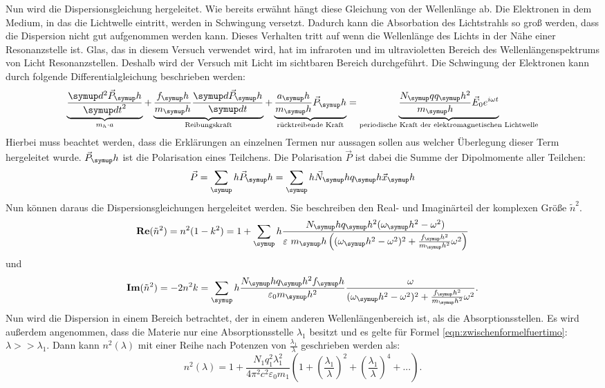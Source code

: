 Nun wird die Dispersionsgleichung hergeleitet. Wie bereits erwähnt hängt diese Gleichung
von der Wellenlänge ab. Die Elektronen in dem Medium, in das die Lichtwelle eintritt,
werden in Schwingung versetzt. Dadurch kann die Absorbation des Lichtstrahls so
groß werden, dass die Dispersion nicht gut aufgenommen werden kann. Dieses Verhalten tritt
auf wenn die Wellenlänge des Lichts in der Nähe einer Resonanzstelle ist.
Glas, das in diesem Versuch verwendet wird, hat im infraroten und im ultravioletten Bereich des
Wellenlängenspektrums von Licht Resonanzstellen. Deshalb wird der Versuch mit Licht im sichtbaren
Bereich durchgeführt.
Die Schwingung der Elektronen kann durch folgende Differentialgleichung beschrieben werden:
\begin{equation}
  \underbrace{\frac{\g{d}^2 \vec{P}_\g{h}}{\g{d t}^2}}_{m_h \cdot a}
   + \underbrace{\frac{f_\g{h}}{m_\g{h}} \frac{\g{d}\vec{P}_\g{h}}{\g{d t}}}_{\text{Reibungskraft}}
   + \underbrace{\frac{a_\g{h}}{m_\g{h}}\vec{P}_\g{h}}_{\text{rücktreibende Kraft}}
   = \underbrace{\frac{N_\g{q} q_\g{h}^2}{m_\g{h}} \vec{E}_0 e^{i \omega t}}_{\text{periodische Kraft der elektromagnetischen Lichtwelle}}
   \label{eqn:DGL}
\end{equation}
Hierbei muss beachtet werden, dass die Erklärungen an einzelnen Termen nur aussagen sollen aus welcher Überlegung
dieser Term hergeleitet wurde. $\vec{P}_\g{h}$ ist die Polarisation eines Teilchens.
Die Polarisation $\vec{P}$ ist dabei die Summe der Dipolmomente aller Teilchen:
\begin{equation*}
  \vec{P} = \sum_\g{h} \vec{P}_\g{h} = \sum_\g{h} \vec{N}_\g{h} q_\g{h} \vec{x}_\g{h}
\end{equation*}
Nun können daraus die Dispersionsgleichungen hergeleitet werden. Sie beschreiben
den Real- und Imaginärteil der komplexen Größe $\tilde{n}^2$.
\begin{equation}
  \textbf{Re}(\tilde{n}^2) = n^2(1- k^2)
  = 1 + \sum_\g{h} \frac{N_\g{h} q_\g{h}^2 (\omega_\g{h}^2-\omega^2)}{\varepsilon~m_\g{h} \left( (\omega_\g{h}^2 - \omega^2)^2 + \frac{f_\g{h}^2}{m_\g{h}^2}\omega^2 \right)}
\end{equation}
und
\begin{equation}
   \textbf{Im}(\tilde{n}^2) = -2 n^2 k
   = \sum_\g{h} \frac{N_\g{h} q_\g{h}^2 f_\g{h}}{\varepsilon_0 m_\g{h}^2} \frac{\omega}{(\omega_\g{h}^2-\omega^2)^2 + \frac{f_\g{h}^2}{m_\g{h}^2} \omega^2 }.
\end{equation}
Nun wird die Dispersion in einem Bereich betrachtet, der in einem anderen Wellenlängenbereich ist, als die Absorptionsstellen. Es wird
außerdem angenommen, dass die Materie nur eine Absorptionsstelle $\lambda_1$ besitzt und
es gelte für Formel \eqref{eqn:zwischenformelfuertimo}: $\lambda >> \lambda_1$.
Dann kann $n^2(\lambda)$ mit einer Reihe nach Potenzen von $\frac{\lambda_1}{\lambda}$
geschrieben werden als:
\begin{equation}
  n^2(\lambda) = 1 + \frac{N_1 q_1^2 \lambda_1^2}{4 \pi^2 c^2 \varepsilon_0 m_1}
  \left( 1 + \left(\frac{\lambda_1}{\lambda}\right)^2 + \left(\frac{\lambda_1}{\lambda}\right)^4 + ...\right).
  \label{eqn:zwischenformelfuertimo}
\end{equation}

